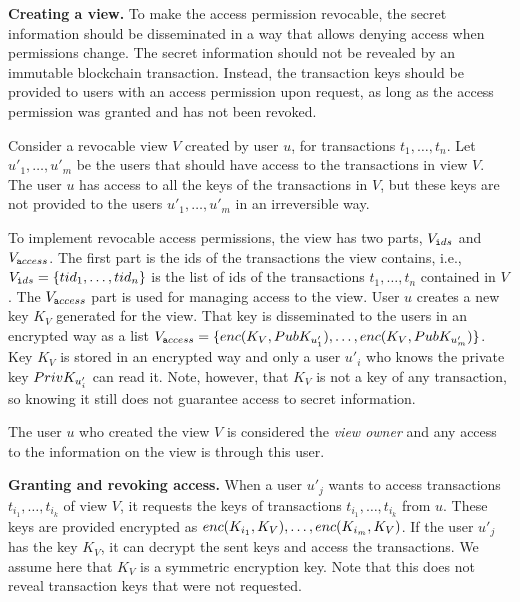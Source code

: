 \medskip
\noindent
\textbf{Creating a view.}
To make the access permission revocable, the secret information should be disseminated in a way that allows denying access when permissions change. The secret information should not be revealed by an immutable blockchain transaction. Instead, the transaction keys should be provided to users with an access permission upon request, as long as the access permission was granted and has not been revoked.

Consider a revocable view $V$ created by user $u$, for transactions $t_1,\ldots, t_n$. Let $u'_1,\ldots, u'_m$ be the users that should have access to the transactions in view $V$.
The user $u$ has access to all the keys of the transactions in $V$, but these keys are not provided to the users $u'_1,\ldots, u'_m$ in an irreversible way. 

To implement revocable access permissions, the view has two parts, $V_{\texttt ids\/}$ and $V_{\texttt access\/}$. The first part is the ids of the transactions the view contains, i.e., $V_{\texttt ids\/} = \{ {tid\/}_{1}, \ldots, {tid\/}_{n}\}$ is the list of ids of the transactions $t_1,\ldots, t_n$ contained in $V$. 
%
The $V_{\texttt access\/}$ part is used for managing access to the view. User $u$ creates a new key $K_V$ generated for the view. That key is disseminated to the users in an encrypted way as a list $V_{\texttt access\/} = \{enc\/(K_V, PubK_{u'_1}), \ldots, enc\/(K_V, PubK_{u'_m})\}$. Key $K_V$ is stored in an encrypted way and only a user $u'_i$ who knows the private key $PrivK_{u'_i}$ can read it. Note, however, that $K_V$ is not a key of any transaction, so knowing it still does not guarantee access to secret information.

The user $u$ who created the view $V$ is considered the {\em view owner\/} and any access to the information on the view is through this user.

\medskip
\noindent
\textbf{Granting and revoking access.}
When a user $u'_j$ wants to access transactions $t_{i_1}, \ldots, t_{i_k}$ of view $V$, it requests the keys of transactions $t_{i_1}, \ldots, t_{i_k}$ from $u$. These keys are provided encrypted as $enc\/(K_{i_1}, K_V), \ldots, enc\/(K_{i_m}, K_V)$. If the user 
$u'_j$ has the key $K_V$, it can decrypt the sent keys and access the transactions. We assume here that $K_V$ is a symmetric encryption key. Note that this does not reveal transaction keys that were not requested.

